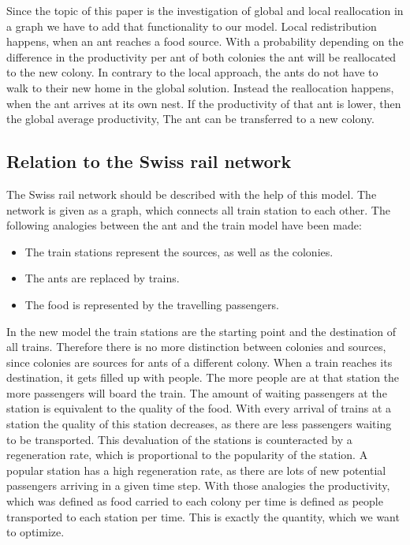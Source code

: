 Since the topic of this paper is the investigation of global and local reallocation in a graph we have to add that functionality to our model. Local redistribution happens, when an ant reaches a food source. With a probability depending on the difference in the productivity per ant of both colonies the ant will be reallocated to the new colony. In contrary to the local approach, the ants do not have to walk to their new home in the global solution. Instead the reallocation happens, when the ant arrives at its own nest. If the productivity of that ant is lower, then the global average productivity, The ant can be transferred to a new colony.
\subsection{Relation to the Swiss rail network}\label{relationNetwork}
The Swiss rail network should be described with the help of this model. The network is given as a graph, which connects all train station to each other. The following analogies between the ant and the train model have been made:
\begin{itemize}
  \item The train stations represent the sources, as well as the colonies.
  \item The ants are replaced by trains.
  \item The food is represented by the travelling passengers.
\end{itemize}
 In the new model the train stations are the starting point and the destination of all trains. Therefore there is no more distinction between colonies and sources, since colonies are sources for ants of a different colony. When a train reaches its destination, it gets filled up with people. The more people are at that station the more passengers will board the train. The amount of waiting passengers at the station is equivalent to the quality of the food. With every arrival of trains at a station the quality of this station decreases, as there are less passengers waiting to be transported. This devaluation of the stations is counteracted by a regeneration rate, which is proportional to the popularity of the station. A popular station has a high regeneration rate, as there are lots of new potential passengers arriving in a given time step. With those analogies the productivity, which was defined as food carried to each colony per time is defined as people transported to each station per time. This is exactly the quantity, which we want to optimize.